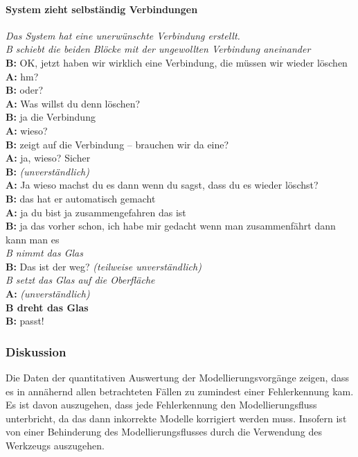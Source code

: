 \paragraph{System zieht selbständig Verbindungen}

\begin{transkript}
\emph{Das System hat eine unerwünschte Verbindung erstellt.} \\
\emph{B schiebt die beiden Blöcke mit der ungewollten Verbindung aneinander} \\
\textbf{B:} OK, jetzt haben wir wirklich eine Verbindung, die müssen wir wieder löschen \\
\textbf{A:} hm? \\
\textbf{B:} oder? \\
\textbf{A:} Was willst du denn löschen? \\
\textbf{B:} ja die Verbindung \\
\textbf{A:} wieso? \\
\textbf{B:} zeigt auf die Verbindung – brauchen wir da eine? \\
\textbf{A:} ja, wieso? Sicher \\
\textbf{B:} \emph{(unverständlich)} \\
\textbf{A:} Ja wieso machst du es dann wenn du sagst, dass du es wieder löschst? \\
\textbf{B:} das hat er automatisch gemacht \\
\textbf{A:} ja du bist ja zusammengefahren das ist \\
\textbf{B:} ja das vorher schon, ich habe mir gedacht wenn man zusammenfährt dann kann man es \\
\emph{B nimmt das Glas} \\
\textbf{B:} Das ist der weg? \emph{(teilweise unverständlich)} \\
\emph{B setzt das Glas auf die Oberfläche} \\
\textbf{A:} \emph{(unverständlich)} \\
\textbf{B dreht das Glas} \\
\textbf{B:} passt! \\
\end{transkript}

\subsubsection{Diskussion} 

Die Daten der quantitativen Auswertung der Modellierungsvorgänge zeigen, dass es in annähernd allen betrachteten Fällen zu zumindest einer Fehlerkennung kam. Es ist davon auszugehen, dass jede Fehlerkennung den Modellierungsfluss unterbricht, da das dann inkorrekte Modelle korrigiert werden muss. Insofern ist von einer Behinderung des Modellierungsflusses durch die Verwendung des Werkzeugs auszugehen.

